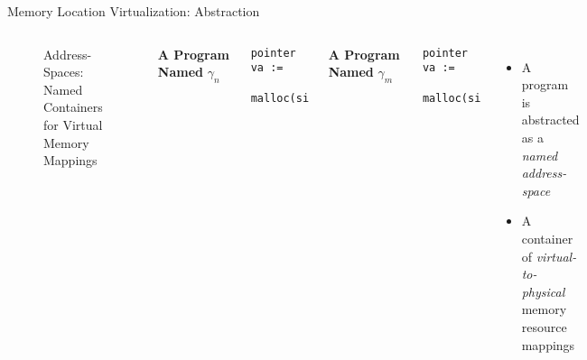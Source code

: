 \documentclass[aspectratio=169,xcolor=dvipsnames]{beamer}
\begin{document}
\begin{frame}[fragile]{Memory Location Virtualization: Abstraction}
\begin{columns}[c]
\begin{figure}
\begin{tikzpicture}[x=0.75pt,y=0.75pt,yscale=-0.5,xscale=0.5]
\end{tikzpicture}



      \caption{Address-Spaces: Named Containers for Virtual Memory Mappings}
    \label{fig:enter-label}
\end{figure}

        \begin{columns}[c]
            \textbf{A Program Named} $\gamma_n$
            \begin{lstlisting}[style=CStyleNum,mathescape]
    pointer va :=
     malloc(size)
\end{lstlisting}
            \textbf{A Program Named} $\gamma_m$
            \begin{lstlisting}[style=CStyleNum,mathescape]
    pointer va := 
     malloc(size)
\end{lstlisting}
        \end{columns}
        \begin{itemize}
      \item  A program is abstracted as a \emph{named address-space}
      \item A container of \emph{virtual-to-physical} memory resource mappings
\end{itemize}
    \end{columns}
\end{frame}

\end{document}
